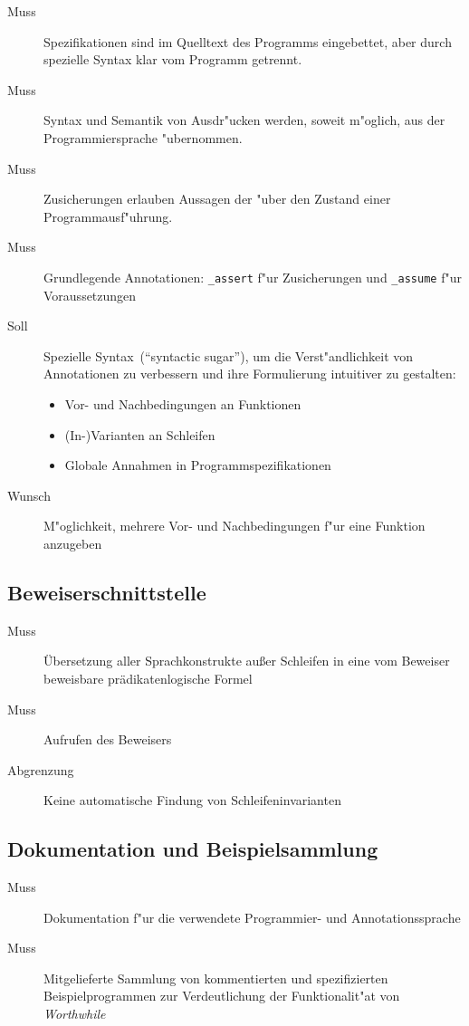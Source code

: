 \begin{description}%
    \item [Muss] Spezifikationen sind im Quelltext des Programms eingebettet, aber durch spezielle Syntax klar vom Programm getrennt.%
    \item [Muss] Syntax und Semantik von Ausdr"ucken werden, soweit m"oglich, aus der Programmiersprache "ubernommen.%
    \item [Muss] Zusicherungen erlauben Aussagen der  "uber den Zustand einer Programmausf"uhrung.%
    \item [Muss] Grundlegende Annotationen: \texttt{\_assert} f"ur Zusicherungen und \texttt{\_assume} f"ur Voraussetzungen%
    \item [Soll] Spezielle Syntax~("`syntactic sugar"'), um die Verst"andlichkeit von Annotationen zu verbessern und ihre Formulierung intuitiver zu gestalten:%
        \begin{itemize}%
            \item Vor- und Nachbedingungen an Funktionen%
            \item (In-)Varianten an Schleifen%
            \item Globale Annahmen in Programmspezifikationen%
        \end{itemize}%
    \item [Wunsch] M"oglichkeit, mehrere Vor- und Nachbedingungen f"ur eine Funktion anzugeben%
\end{description}%

\subsection{Beweiserschnittstelle}%

\begin{description}%
    \item [Muss] Übersetzung aller Sprachkonstrukte außer Schleifen in eine vom Beweiser beweisbare prädikatenlogische Formel
    \item [Muss] Aufrufen des Beweisers
    \item [Abgrenzung] Keine automatische Findung von Schleifeninvarianten
\end{description}%

\subsection{Dokumentation und Beispielsammlung}%

\begin{description}%
    \item [Muss] Dokumentation f"ur die verwendete Programmier- und Annotationssprache%
    \item [Muss] Mitgelieferte Sammlung von kommentierten und spezifizierten Beispielprogrammen zur Verdeutlichung der Funktionalit"at von \textit{Worthwhile}%
\end{description}%

